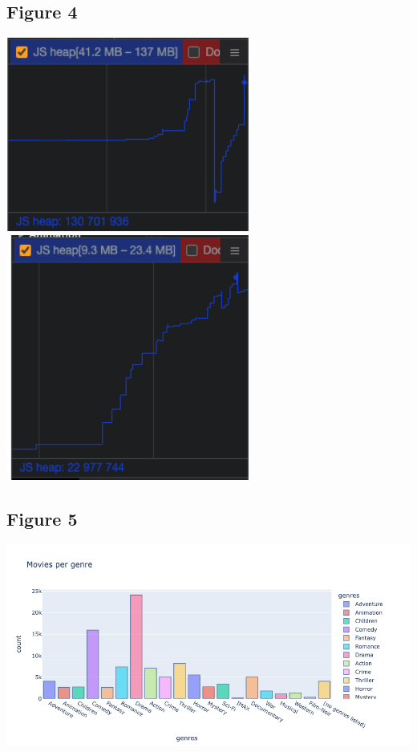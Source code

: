 \documentclass{article}
\begin{document}
\subsection{Figure 4}
\includegraphics[width=0.6\textwidth]{img/js_heap_plotly.png}
\includegraphics[width=0.6\textwidth]{img/js_heap_datashader.png}

\subsection{Figure 5}
\includegraphics[width=1\textwidth]{img/movies_genre.png}
\end{document}
